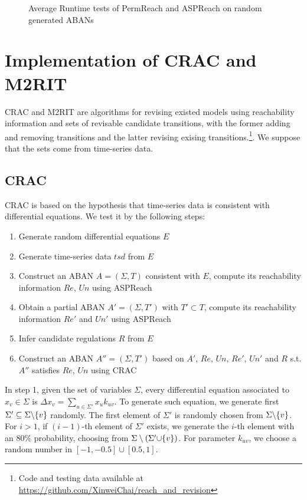\begin{figure}[ht]
    \caption[Runtime tests of reachability analyzers]{Average Runtime tests of PermReach and ASPReach on random generated ABANs}
\end{figure}

\section{Implementation of CRAC and M2RIT}
CRAC and M2RIT are algorithms for revising existed models using reachability information and sets of revisable candidate transitions, with the former adding and removing transitions and the latter revising exising transitions.\footnote{Code and testing data available at \url{https://github.com/XinweiChai/reach_and_revision}}.
We suppose that the sets come from time-series data.

\subsection{CRAC}
CRAC is based on the hypothesis that time-series data is consistent with differential equations.
We test it by the following steps:
\begin{enumerate}
    \item Generate random differential equations $E$
    \item Generate time-series data $tsd$ from $E$
    \item Construct an ABAN $A=(\Sigma, T)$ consistent with $E$, compute its reachability information $Re$, $Un$ using ASPReach
    \item Obtain a partial ABAN $A'=(\Sigma, T')$ with $T'\subset T$, compute its reachability information $Re'$ and $Un'$ using ASPReach
    \item Infer candidate regulations $R$ from $E$
    \item Construct an ABAN $A''=(\Sigma, T')$ based on $A'$, $Re$, $Un$, $Re'$, $Un'$ and $R$ s.t. $A''$ satisfies $Re$, $Un$ using CRAC
\end{enumerate}


In step 1, given the set of variables $\Sigma$, every differential equation associated to $x_v\in \Sigma$ is $\Delta x_v=\sum_{u\in \Sigma'}x_u k_{uv}$. 
To generate such equation, we generate first $\Sigma'\subseteq \Sigma\miset{v}$ randomly.
The first element of $\Sigma'$ is randomly chosen from $\Sigma\miset{v}$.
For $i>1$, if $(i-1)$-th element of $\Sigma'$ exists, we generate the $i$-th element with an 80\% probability, choosing from $\Sigma\setminus(\Sigma'\addset{v})$.
For parameter $k_{uv}$, we choose a random number in $[-1,-0.5]\cup[0.5,1]$.

